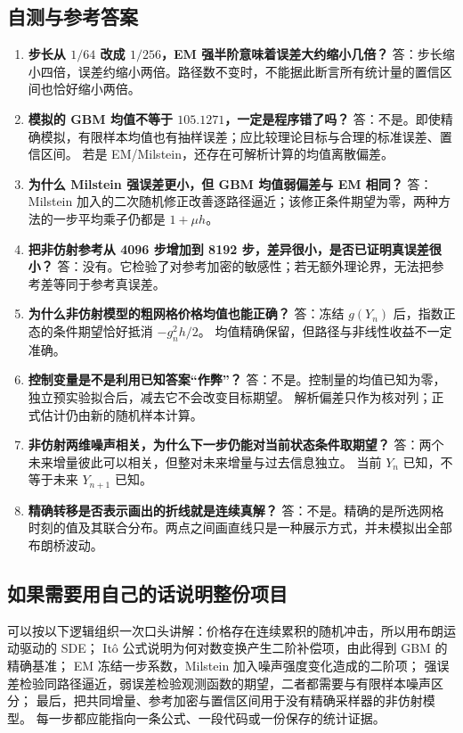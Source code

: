 \documentclass[11pt,a4paper,fontset=none]{ctexart}
\numberwithin{equation}{section}
\begin{document}
\subsection{自测与参考答案}
\begin{enumerate}
\item \textbf{步长从 $1/64$ 改成 $1/256$，EM 强半阶意味着误差大约缩小几倍？}
答：步长缩小四倍，误差约缩小两倍。路径数不变时，不能据此断言所有统计量的置信区间也恰好缩小两倍。
\item \textbf{模拟的 GBM 均值不等于 $105.1271$，一定是程序错了吗？}
答：不是。即使精确模拟，有限样本均值也有抽样误差；应比较理论目标与合理的标准误差、置信区间。
若是 EM/Milstein，还存在可解析计算的均值离散偏差。
\item \textbf{为什么 Milstein 强误差更小，但 GBM 均值弱偏差与 EM 相同？}
答：Milstein 加入的二次随机修正改善逐路径逼近；该修正条件期望为零，两种方法的一步平均乘子仍都是 $1+\mu h$。
\item \textbf{把非仿射参考从 4096 步增加到 8192 步，差异很小，是否已证明真误差很小？}
答：没有。它检验了对参考加密的敏感性；若无额外理论界，无法把参考差等同于参考真误差。
\item \textbf{为什么非仿射模型的粗网格价格均值也能正确？}
答：冻结 $g(Y_n)$ 后，指数正态的条件期望恰好抵消 $-g_n^2h/2$。
均值精确保留，但路径与非线性收益不一定准确。
\item \textbf{控制变量是不是利用已知答案“作弊”？}
答：不是。控制量的均值已知为零，独立预实验拟合后，减去它不会改变目标期望。
解析偏差只作为核对列；正式估计仍由新的随机样本计算。
\item \textbf{非仿射两维噪声相关，为什么下一步仍能对当前状态条件取期望？}
答：两个未来增量彼此可以相关，但整对未来增量与过去信息独立。
当前 $Y_n$ 已知，不等于未来 $Y_{n+1}$ 已知。
\item \textbf{精确转移是否表示画出的折线就是连续真解？}
答：不是。精确的是所选网格时刻的值及其联合分布。两点之间画直线只是一种展示方式，并未模拟出全部布朗桥波动。
\end{enumerate}

\subsection{如果需要用自己的话说明整份项目}
可以按以下逻辑组织一次口头讲解：价格存在连续累积的随机冲击，所以用布朗运动驱动的 SDE；
Itô 公式说明为何对数变换产生二阶补偿项，由此得到 GBM 的精确基准；
EM 冻结一步系数，Milstein 加入噪声强度变化造成的二阶项；
强误差检验同路径逼近，弱误差检验观测函数的期望，二者都需要与有限样本噪声区分；
最后，把共同增量、参考加密与置信区间用于没有精确采样器的非仿射模型。
每一步都应能指向一条公式、一段代码或一份保存的统计证据。
\end{document}
